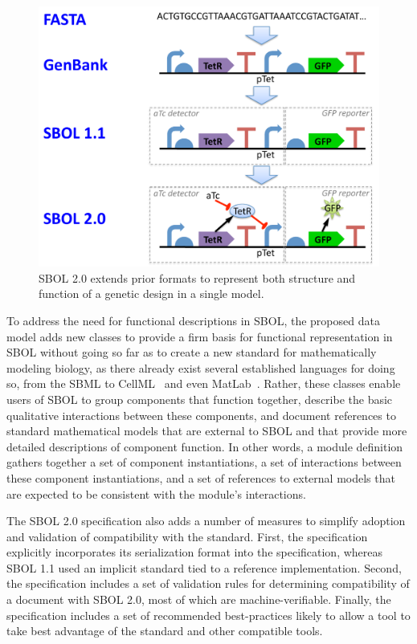 \begin{figure}
\centering
\includegraphics[width=5in]{images/format-comparison.pdf}
\caption{SBOL 2.0 extends prior formats to represent both structure and function of a genetic design in a single model.}
\end{figure}

To address the need for functional descriptions in SBOL, the proposed data model adds new classes to provide a firm basis for functional representation in SBOL without going so far as to create a new standard for mathematically modeling biology, as there already exist several established languages for doing so, from the SBML to CellML~\cite{CellML} and even MatLab~\cite{matlab}. Rather, these classes enable users of SBOL to group components that function together, describe the basic qualitative interactions between these components, and document references to standard mathematical models that are external to SBOL and that provide more detailed descriptions of component function. In other words, a module definition gathers together a set of component instantiations, a set of interactions between these component instantiations, and a set of references to external models that are expected to be consistent with the module's interactions.

The SBOL 2.0 specification also adds a number of measures to simplify adoption and validation of compatibility with the standard.
First, the specification explicitly incorporates its serialization format into the specification, whereas SBOL 1.1 used an implicit standard tied to a reference implementation.
Second, the specification includes a set of validation rules for determining compatibility of a document with SBOL 2.0, most of which are machine-verifiable.
Finally, the specification includes a set of recommended best-practices likely to allow a tool to take best advantage of the standard and other compatible tools.

